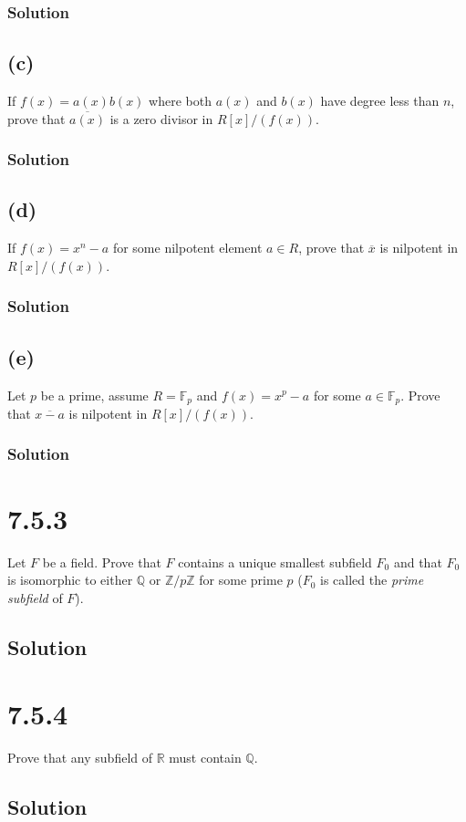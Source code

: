\documentclass[fleqn]{article}
\begin{document}
            \subsubsection{Solution}
            
        
        \subsection{(c)}
        If $f(x) = a(x) b(x)$ where both $a(x)$ and $b(x)$ have degree less than $n$, prove that $\overline{a(x)}$ is a zero divisor in $R[x]/(f(x))$.
            
            \subsubsection{Solution}
            
        
        \subsection{(d)}
        If $f(x) = x^n - a$ for some nilpotent element $a \in R$, prove that $\overline{x}$ is nilpotent in $R[x]/(f(x))$.
            
            \subsubsection{Solution}
            
        
        \subsection{(e)}
        Let $p$ be a prime, assume $R = \mathbb{F}_p$ and $f(x) = x^p - a$ for some $a \in \mathbb{F}_p$.  Prove that $\overline{x - a}$ is nilpotent in $R[x]/(f(x))$.
            
            \subsubsection{Solution}
            
    
    \section{7.5.3}
    Let $F$ be a field.  Prove that $F$ contains a unique smallest subfield $F_0$ and that $F_0$ is isomorphic to either $\mathbb{Q}$ or $\mathbb{Z}/p\mathbb{Z}$ for some prime $p$ ($F_0$ is called the \textit{prime subfield} of $F$).
        
        \subsection{Solution}
        
    
    \section{7.5.4}
    Prove that any subfield of $\mathbb{R}$ must contain $\mathbb{Q}$.
        
        \subsection{Solution}
        
    
\end{document}
